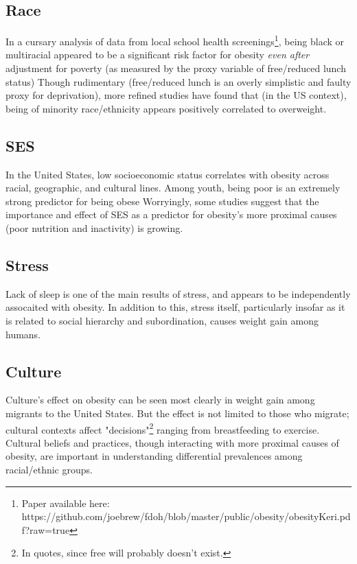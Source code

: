 \documentclass[11pt]{article}
\begin{document}
\begin{multicols}{2}
\subsection*{Race}
In a cursary analysis of data from local school health screenings\footnote{Paper available here: https://github.com/joebrew/fdoh/blob/master/public/obesity/obesityKeri.pdf?raw=true}, being black or multiracial appeared to be a significant risk factor for obesity \emph{even after} adjustment for poverty (as measured by the proxy variable of free/reduced lunch status)\cite{Brew2014} Though rudimentary (free/reduced lunch is an overly simplistic and faulty proxy for deprivation), more refined studies have found that (in the US context), being of minority race/ethnicity appears positively correlated to overweight.\cite{Li2014}

\subsection*{SES}
In the United States, low socioeconomic status correlates with obesity across racial, geographic, and cultural lines.  Among youth, being poor is an extremely strong predictor for being obese\cite{Lawman2014} Worryingly, some studies suggest that the importance and effect of SES as a predictor for obesity's more proximal causes (poor nutrition and inactivity) is growing.\cite{Buchtal2014}    


\subsection*{Stress}
Lack of sleep is one of the main results of stress, and appears to be independently assocaited with obesity.\cite{Graef2014}  In addition to this, stress itself, particularly insofar as it is related to social hierarchy and subordination, causes weight gain among humans.\cite{Tamashiro2007}

\subsection*{Culture}
Culture's effect on obesity can be seen most clearly in weight gain among migrants to the United States.\cite{Tovar2012} But the effect is not limited to those who migrate; cultural contexts affect "decisions"\footnote{In quotes, since free will probably doesn't exist.} ranging from breastfeeding to exercise.\cite{Young2012} Cultural beliefs and practices, though interacting with more proximal causes of obesity, are important in understanding differential prevalences among racial/ethnic groups.\cite{Spraggins2011}


\end{multicols}
\end{document}
